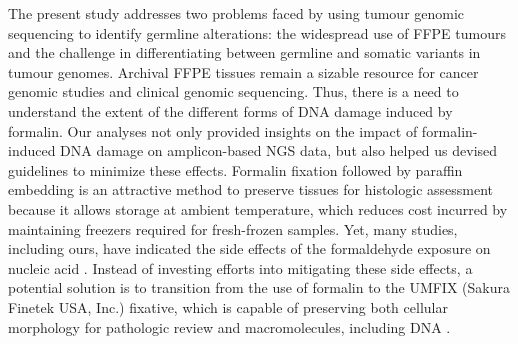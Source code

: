 The present study addresses two problems faced by using tumour genomic sequencing to identify germline alterations: the widespread use of FFPE tumours and the challenge in differentiating between germline and somatic variants in tumour genomes. Archival FFPE tissues remain a sizable resource for cancer genomic studies and clinical genomic sequencing. Thus, there is a need to understand the extent of the different forms of DNA damage induced by formalin. Our analyses not only provided insights on the impact of formalin-induced DNA damage on amplicon-based NGS data, but also helped us devised guidelines to minimize these effects. Formalin fixation followed by paraffin embedding is an attractive method to preserve tissues for histologic assessment because it allows storage at ambient temperature, which reduces cost incurred by maintaining freezers required for fresh-frozen samples. Yet, many studies, including ours, have indicated the side effects of the formaldehyde exposure on nucleic acid \cite{Do2015a, Kim2017, Ofner2017, Oh2015, Wong2013, Wong2014, Sikorsky2007}. Instead of investing efforts into mitigating these side effects, a potential solution is to transition from the use of formalin to the UMFIX (Sakura Finetek USA, Inc.) fixative, which is capable of preserving both cellular morphology for pathologic review and macromolecules, including DNA \cite{Vincek2003}.

